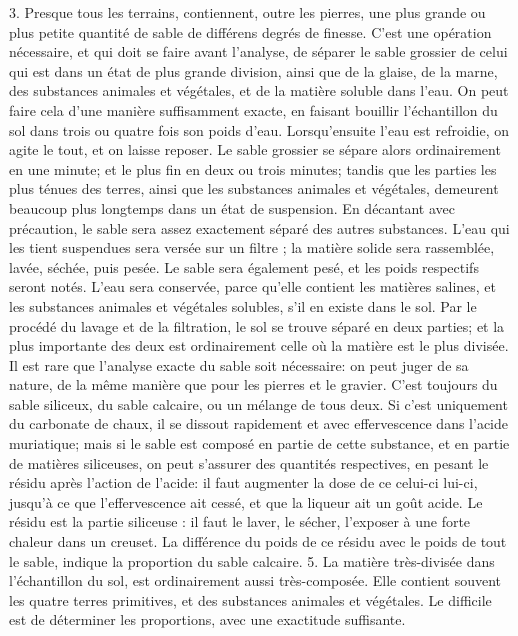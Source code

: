 3. Presque tous les terrains, contiennent, outre les pierres, une plus grande ou plus petite quantité de sable de différens degrés de finesse. C'est une opération nécessaire, et qui doit se faire avant l'analyse, de séparer le sable grossier de celui qui est dans un état de plus grande division, ainsi que de la glaise, de la marne, des substances animales et végétales, et de la matière soluble dans l'eau. On peut faire cela d'une manière suffisamment exacte, en faisant bouillir l'échantillon du sol dans trois ou quatre fois son poids d'eau. Lorsqu'ensuite l'eau est refroidie, on agite le tout, et on laisse reposer. Le sable grossier se sépare alors ordinairement en une minute; et le plus fin en deux ou trois minutes; tandis que les parties les plus ténues des terres, ainsi que les substances animales et\setcounter{page}{426} végétales, demeurent beaucoup plus longtemps dans un état de suspension. En décantant avec précaution, le sable sera assez exactement séparé des autres substances. L'eau qui les tient suspendues sera versée sur un filtre ; la matière solide sera rassemblée, lavée, séchée, puis pesée. Le sable sera également pesé, et les poids respectifs seront notés. L'eau sera conservée, parce qu'elle contient les matières salines, et les substances animales et végétales solubles, s'il en existe dans le sol.
Par le procédé du lavage et de la filtration, le sol se trouve séparé en deux parties; et la plus importante des deux est ordinairement celle où la matière est le plus divisée. Il est rare que l'analyse exacte du sable soit nécessaire: on peut juger de sa nature, de la même manière que pour les pierres et le gravier. C'est toujours du sable siliceux, du sable calcaire, ou un mélange de tous deux. Si c'est uniquement du carbonate de chaux, il se dissout rapidement et avec effervescence dans l'acide muriatique; mais si le sable est composé en partie de cette substance, et en partie de matières siliceuses, on peut s'assurer des quantités respectives, en pesant le résidu après l'action de l'acide: il faut augmenter la dose de ce celui-ci\setcounter{page}{427} lui-ci, jusqu'à ce que l'effervescence ait cessé, et que la liqueur ait un goût acide. Le résidu est la partie siliceuse : il faut le laver, le sécher, l'exposer à une forte chaleur dans un creuset. La différence du poids de ce résidu avec le poids de tout le sable, indique la proportion du sable calcaire.
5. La matière très-divisée dans l'échantillon du sol, est ordinairement aussi très-composée. Elle contient souvent les quatre terres primitives, et des substances animales et végétales. Le difficile est de déterminer les proportions, avec une exactitude suffisante.
